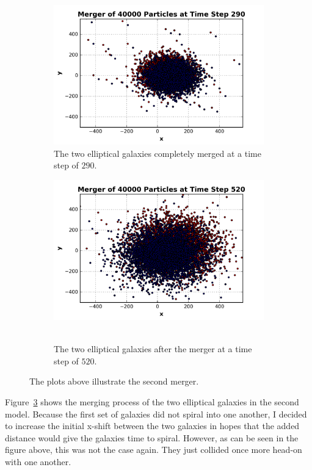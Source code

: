 \documentclass[12pt]{report}
\begin{document}
\begin{figure}[H]
\begin{subfigure}[b]{0.48\textwidth}
            \centering 
            \includegraphics[width=\linewidth]{merger2_t290.png}
            \caption[]%
            {{\small The two elliptical galaxies completely merged at a time step of $290$.}}    
            \label{fig:merger2_t200}
        \end{subfigure}
        \quad
        \begin{subfigure}[b]{0.48\textwidth}   
            \centering 
            \includegraphics[width=\textwidth]{merger2_t520.png}\
            \caption[]%
            {{\small The two elliptical galaxies after the merger at a time step of $520$.}}
            \label{fig:merger2_t520}
        \end{subfigure}
        \caption[]
        {The plots above illustrate the second merger.}
        \label{fig:merger2}
    \end{figure}
    
  Figure~\ref{fig:merger2} shows the merging process of the two elliptical galaxies in the second model. Because the first set of galaxies did not spiral into one another, I decided to increase the initial x-shift between the two galaxies in hopes that the added distance would give the galaxies time to spiral. However, as can be seen in the figure above, this was not the case again. They just collided once more head-on with one another.
    
\end{document}
